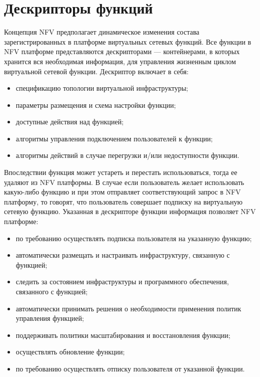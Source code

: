 \documentclass[oneside,final,14pt,a4paper]{extreport}
\begin{document}
\section{Дескрипторы функций}
Концепция NFV предполагает динамическое изменения состава зарегистрированных в платформе виртуальных сетевых функций. Все функции в NFV платформе представляются дескрипторами --- контейнерами, в которых хранится вся необходимая информация, для управления жизненным циклом виртуальной сетевой функции. Дескриптор включает в себя:
\begin{itemize}
    \item спецификацию топологии виртуальной инфраструктуры;
    \item параметры размещения и схема настройки функции;
    \item доступные действия над функцией;
    \item алгоритмы управления подключением пользователей к функции;
    \item алгоритмы действий в случае перегрузки и/или недоступности функции.
\end{itemize}

Впоследствии функция может устареть и перестать использоваться, тогда ее удаляют из NFV платформы. В случае если пользователь желает использовать какую-либо функцию и при этом отправляет соответствующий запрос в NFV платформу, то говорят, что пользователь совершает подписку на виртуальную сетевую функцию. Указанная в дескрипторе функции информация позволяет NFV платформе:
\begin{itemize}
    \item по требованию осуществлять подписка пользователя на указанную функцию;
    \item автоматически размещать и настраивать инфраструктуру, связанную с функцией;
    \item следить за состоянием инфраструктуры и программного обеспечения, связанного с функцией;
    \item автоматически принимать решения о необходимости применения политик управления функцией;
    \item поддерживать политики масштабирования и восстановления функции;
    \item осуществлять обновление функции;
    \item по требованию осуществлять отписку пользователя от указанной функции.
\end{itemize}
\end{document}
